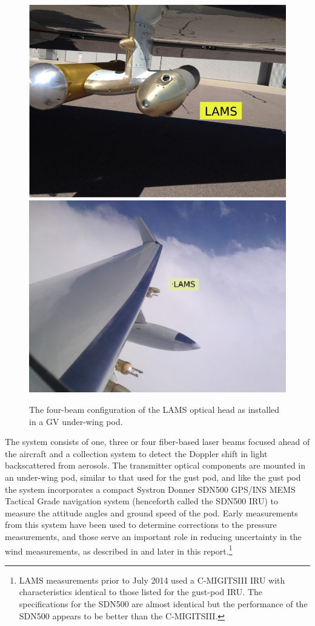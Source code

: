 \documentclass[12pt,twoside,english]{article}\usepackage[]{graphicx}\usepackage[]{color}
\let\OrgIndex\index
\renewcommand*{\index}[1]{\OrgIndex{#1}}
\begin{document}
\begin{figure}%
\noindent \begin{centering}%
\includegraphics[width=0.59\columnwidth]{SpecialGraphics/LAMS-1r}%
\includegraphics[width=0.4\columnwidth]{SpecialGraphics/LAMS-2r}%
\caption{The four-beam configuration of the LAMS optical head as installed in a GV under-wing pod.}%
\label{fig:LAMS-4Beam}%
\end{centering}%
\end{figure}%
The system consists of one, three or four fiber-based laser beams focused ahead of the aircraft and a collection system to detect the Doppler shift in light backscattered from aerosols. The transmitter optical components are mounted in an under-wing pod, similar to that used for the gust pod, and like the gust pod the system incorporates a compact Systron Donner SDN500 GPS/INS MEMS Tactical Grade navigation system (henceforth called the SDN500 IRU) to measure the attitude angles and ground speed of the pod. Early measurements from this system have been used to determine corrections to the pressure measurements, and those serve an important role in reducing uncertainty in the wind measurements, as described in \citet{CooperEtAl2014} and later in this report.\footnote{LAMS measurements prior to July 2014 used a C-MIGITSIII IRU with characteristics identical to those listed for the gust-pod IRU. The specifications for the SDN500 are almost
identical but the performance of the SDN500 appears to be better than the C-MIGITSIII.} 
\end{document}
